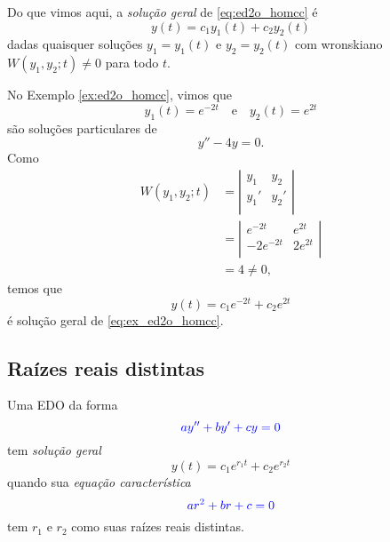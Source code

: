 Do que vimos aqui, a \emph{solução geral} de \eqref{eq:ed2o_homcc} é
\begin{equation}
  y(t) = c_1y_1(t) + c_2y_2(t)
\end{equation}
dadas quaisquer soluções  $y_1 = y_1(t)$ e $y_2 = y_2(t)$ com wronskiano $W(y_1,y_2;t)\neq 0$ para todo $t$.

\begin{ex}
  No Exemplo \ref{ex:ed2o_homcc}, vimos que
  \begin{equation}
    y_1(t) = e^{-2t}\quad\text{e}\quad y_2(t) = e^{2t}
  \end{equation}
  são soluções particulares de
  \begin{equation}\label{eq:ex_ed2o_homcc}
    y'' - 4y = 0.
  \end{equation}
  Como
  \begin{align}
    W(y_1,y_2;t) &= \left|\begin{matrix}
        y_1 & y_2 \\
        y_1' & y_2' \\
      \end{matrix}\right| \\
                 &= \left|\begin{matrix}
                     e^{-2t} & e^{2t} \\
                     -2e^{-2t} & 2e^{2t} \\
                   \end{matrix}\right| \\
                 &= 4 \neq 0,
  \end{align}
  temos que
  \begin{equation}
    y(t) = c_1e^{-2t} + c_2e^{2t}
  \end{equation}
  é solução geral de \eqref{eq:ex_ed2o_homcc}.
\end{ex}

\subsection{Raízes reais distintas}

Uma EDO da forma
\begin{equation}
  {\color{blue}ay'' + by' + cy = 0}
\end{equation}
tem \emph{solução geral}
\begin{equation}
  y(t) = c_1e^{r_1t} + c_2e^{r_2t}
\end{equation}
quando sua \emph{equação característica}
\begin{equation}
  {\color{blue}ar^2 + br + c = 0}
\end{equation}
tem $r_1$ e $r_2$ como suas raízes reais distintas.

